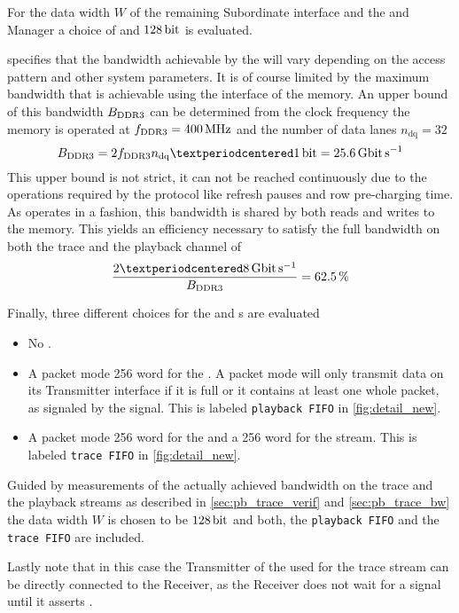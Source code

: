 For the data width $W$ of the remaining \XilinxMIG{} \AXI{} Subordinate interface and the \SToMM{} and \MMToS{} \AXI{} Manager a choice of \PhyWordSize{} and $\SI{128}{\bit}$ is evaluated.

\Xilinx{} specifies that the bandwidth achievable by the \XilinxMIG{} will vary depending on the access pattern and other system parameters. It is of course limited by the maximum bandwidth that is achievable using the \DDR{} interface of the memory. An upper bound of this bandwidth $B_{\text{DDR3{}}}$ can be determined from the clock frequency the memory is operated at $f_{\text{DDR3{}}} = \SI{400}{\mega\hertz}$ and the number of data lanes $n_{\text{dq}} = \num{32}$
\[B_{\text{\DDR{}}} = 2 f_{\text{\DDR{}}} n_{\text{dq}} · \SI{1}{\bit} = \SI{25.6}{\giga\bit\per\second}\]
This upper bound is not strict, it can not be reached continuously due to the operations required by the \DDR{} protocol like refresh pauses and row pre-charging time\autocite{ref:ddr3_standard}. As \DDR{} operates in a \halfduplex{} fashion, this bandwidth is shared by both reads and writes to the memory. This yields an efficiency necessary to satisfy the full bandwidth on both the trace and the playback channel of
\[\frac{2 · \pbExecBandwidth{}}{B_{\text{\DDR{}}}} = \SI{62.5}{\percent}\]

Finally, three different choices for the \SToMM{} and \MMToS{} \FIFO{}s are evaluated
\begin{itemize}
\item No \FIFO{}.
\item A packet mode \num{256} word \FIFO{} for the \MMToS{} \AXIStream{}. A packet mode \FIFO{} will only transmit data on its Transmitter interface if it is full or it contains at least one whole packet, as signaled by the \TLAST{} signal. This \FIFO{} is labeled \texttt{playback FIFO} in \autoref{fig:detail_new}.
\item A packet mode \num{256} word \FIFO{} for the \MMToS{} \AXIStream{} and a \num{256} word \FIFO{} for the \SToMM{} stream. This \FIFO{} is labeled \texttt{trace FIFO} in \autoref{fig:detail_new}.
\end{itemize}

Guided by measurements of the actually achieved bandwidth on the trace and the playback streams as described in \autoref{sec:pb_trace_verif} and \autoref{sec:pb_trace_bw} the data width $W$ is chosen to be $\SI{128}{\bit}$ and both, the \texttt{playback FIFO} and the \texttt{trace FIFO} are included.

Lastly note that in this case the \ValidNextStream{} Transmitter of the \pbexec{} used for the trace stream can be directly connected to the \SToMM{} \AXIStream{} Receiver, as the \SToMM{} \AXIStream{} Receiver does not wait for a \TVALID{} signal until it asserts \TREADY{}.


